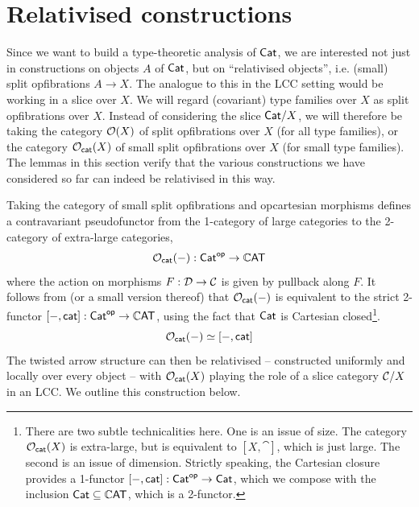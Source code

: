 \section*{Relativised constructions} 
Since we want to build a type-theoretic analysis of $\mathsf{Cat}$,
we are interested not just in constructions on objects $A$ of $\mathsf{Cat}$,
but on ``relativised objects'', i.e. (small) split opfibrations $A \to X$.
The analogue to this in the LCC setting would be working in a slice over $X$.
We will regard (covariant) type families over $X$ as split opfibrations over $X$.
Instead of considering the slice $\mathsf{Cat} / X$,
we will therefore be taking the category ${\mathcal{O}}(X)$ of split opfibrations over $X$
(for all type families),
or the category ${\mathcal{O}}_{\mathsf{cat}}(X)$ of small split opfibrations over $X$
(for small type families).
The lemmas in this section verify that the various constructions we
have considered so far can indeed be relativised in this way.

Taking the category of small split opfibrations and
opcartesian morphisms defines a contravariant pseudofunctor
from the 1-category of large categories
to the 2-category of extra-large categories,
\[{\mathcal{O}}_{\mathsf{cat}}(-) : \mathsf{Cat}^{\mathsf{op}} \to \mathbb{C}\mathsf{AT}\]
where the action on morphisms $F : \mathcal{D} \to \mathcal{C}$ is given by
pullback along $F$.
It follows from  (or a small version thereof)
that ${\mathcal{O}}_{\mathsf{cat}}(-)$ is equivalent to the strict 2-functor
$[-,\mathsf{cat}] : \mathsf{Cat}^{\mathsf{op}} \to \mathbb{C}\mathsf{AT}$,
using the fact that $\mathsf{Cat}$ is Cartesian closed\footnote{
  There are two subtle technicalities here.
  One is an issue of size.
  The category ${\mathcal{O}}_{\mathsf{cat}}(X)$ is extra-large,
  but is equivalent to $[X,\cat]$,
  which is just large.
  The second is an issue of dimension.
  Strictly speaking, the Cartesian closure provides a 1-functor
  $[-,\mathsf{cat}] : \mathsf{Cat}^{\mathsf{op}} \to \mathsf{Cat}$,
  which we compose with the inclusion $\mathsf{Cat} \subseteq \mathbb{C}\mathsf{AT}$,
  which is a 2-functor.}.
\[{\mathcal{O}}_{\mathsf{cat}}(-) \simeq [-,\mathsf{cat}]\]
The twisted arrow structure can then be relativised --
constructed uniformly and locally over every object --
with ${\mathcal{O}}_{\mathsf{cat}}(X)$ playing the role of
a slice category $\mathcal{C} / X$ in an LCC.
We outline this construction below.

